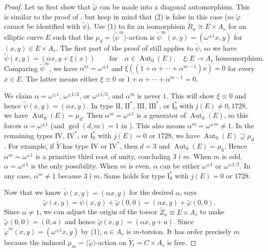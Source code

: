 \documentclass[reqno, letterpaper]{amsart}
\numberwithin{equation}{subsection}
\let\to\longrightarrow
\DeclareMathOperator{\Aut}{Aut}
\begin{document}
		\begin{proof}
			Let us first show that $\tilde \varphi$ can be made into a diagonal automorphism. This is similar to the proof of , but keep in mind that (2) is false in this case (so $\tilde \varphi$ cannot be identified with $\tilde \psi$). Use (1) to fix an isomorphism $\tilde R_u \cong E \times A_s$ for an elliptic curve $E$ such that the $\mu_d = \langle \tilde \psi^m \rangle$-action is $\tilde \psi^m(x,y) = (\omega^{\pm1} x, y)$ for $(x,y) \in E \times A_s$. The first part of the proof of  still applies to $\tilde \psi$, so we have
			\[ \tilde \psi (x,y) = (\alpha x, y + \xi(x)) \qquad\mbox{for}\quad \alpha \in \Aut_0(E), \quad \xi : E \to A_s \mbox{ homomorphism} .\]
			Comparing $\tilde \psi^m$, we have $\alpha^m = \omega^{\pm1}$ and $\xi ((1 + \alpha + \cdots + \alpha^{m-1})x) = 0$ for every $x \in E$. The latter means either $\xi \equiv 0$ or $1 + \alpha + \cdots + \alpha^{m-1} = 0$.
			
			\medskip
			
			We claim $\alpha = \omega^{\pm1}$, $\omega^{\pm1/2}$, or $\omega^{\pm1/3}$, and $\alpha^m$ is never $1$. This will show $\xi \equiv 0$ and hence $\tilde \psi (x,y) = (\alpha x, y)$. In type $\mathrm{II}$, $\mathrm{II}^*$, $\mathrm{III}$, $\mathrm{III}^*$, or $\mathrm I_0^*$ with $j(E) \neq 0,1728$, we have $\Aut_0(E) = \mu_d$. Then $\alpha^m = \omega^{\pm1}$ is a generator of $\Aut_0(E)$, so this forces $\alpha = \omega^{\pm1}$ (and $\gcd (d,m) = 1$ in ). This also means $\alpha^m = \omega^{\pm m} \neq 1$. In the remaining types $\mathrm{IV}$, $\mathrm{IV}^*$, or $\mathrm I_0^*$ with $j(E) = 0$ or $1728$, we have $\Aut_0(E) \supsetneq \mu_d$. For example, if $\tilde Y$ has type $\mathrm{IV}$ or $\mathrm{IV}^*$, then $d = 3$ and $\Aut_0(E) = \mu_6$. Hence $\alpha^m = \omega^{\pm1}$ is a primitive third root of unity, concluding $3 \nmid m$. When $m$ is odd, $\alpha = \omega^{\pm1}$ is the only possibility. When $m$ is even, $\alpha$ can be either $\omega^{\pm1}$ or $\omega^{\pm1/2}$. In any case, $\alpha^m \neq 1$ because $3 \nmid m$. Same holds for type $\mathrm I_0^*$ with $j(E) = 0$ or $1728$.
			
			\medskip
			
			Now that we know $\tilde \psi(x,y) = (\alpha x, y)$ for the desired $\alpha$,  says
			\[ \tilde \varphi (x,y) = \tilde \psi(x,y) + \tilde \varphi(0,0) = (\alpha x, y) + \tilde \varphi(0,0) .\]
			Since $\alpha \neq 1$, we can adjust the origin of the torsor $\tilde Z_u \cong E \times A_s$ to make $\tilde \varphi(0,0) = (0, a)$ and hence $\tilde \varphi(x,y) = (\alpha x, y+a)$. Since $\tilde \varphi^m (x,y) = (\omega^{\pm1} x, y)$ by (1), $a \in A_s$ is $m$-torsion. It has order precisely $m$ because the induced $\mu_m = \langle \tilde \varphi \rangle$-action on $\tilde Y_t = C \times A_s$ is free.
		\end{proof}
		
\end{document}
